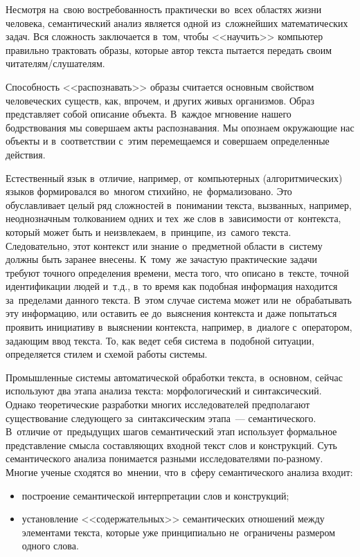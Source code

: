 \documentclass[12pt]{article}
\theoremstyle{definition}
\theoremstyle{remark}
\numberwithin{equation}{section}
\begin{document}
Несмотря на~свою востребованность практически во~всех областях жизни 
человека, семантический анализ является одной из~сложнейших математических 
задач. Вся сложность заключается в~том, чтобы <<научить>> компьютер 
правильно трактовать образы, которые автор текста пытается передать 
своим читателям/слушателям.

Способность <<распознавать>> образы считается основным свойством 
человеческих существ, как, впрочем, и других живых организмов. 
Образ представляет собой описание объекта. В~каждое мгновение 
нашего бодрствования мы совершаем акты распознавания. Мы опознаем 
окружающие нас объекты и в~соответствии с~этим перемещаемся и 
совершаем определенные действия.

Естественный язык в~отличие, например, от~компьютерных (алгоритмических) 
языков формировался во~многом стихийно, не~формализовано. Это 
обуславливает целый ряд сложностей в~понимании текста, вызванных, 
например, неоднозначным толкованием одних и тех~же слов в~зависимости 
от~контекста, который может быть и неизвлекаем, в~принципе, из~самого 
текста. Следовательно, этот контекст или знание о~предметной области 
в~систему должны быть заранее внесены. К~тому~же зачастую практические 
задачи требуют точного определения времени, места того, что описано 
в~тексте, точной идентификации людей и~т.д., в~то время как подобная 
информация находится за~пределами данного текста. В~этом случае система 
может или не~обрабатывать эту информацию, или оставить ее до~выяснения 
контекста и даже попытаться проявить инициативу в~выяснении контекста, 
например, в~диалоге с~оператором, задающим ввод текста. То, как ведет 
себя система в~подобной ситуации, определяется стилем и схемой работы 
системы.

Промышленные системы автоматической обработки текста, в~основном, сейчас 
используют два этапа анализа текста: морфологический и синтаксический. 
Однако теоретические разработки многих исследователей предполагают 
существование следующего за~синтаксическим этапа~--- семантического. 
В~отличие от~предыдущих шагов семантический этап использует формальное 
представление смысла составляющих входной текст слов и конструкций. 
Суть семантического анализа понимается разными исследователями по-разному. 
Многие ученые сходятся во~мнении, что в~сферу семантического анализа входит:
\begin{itemize}
    \item построение семантической интерпретации слов и конструкций;
    \item установление <<содержательных>> семантических отношений 
    между элементами текста, которые уже принципиально не~ограничены 
    размером одного слова.
\end{itemize}
\end{document}
